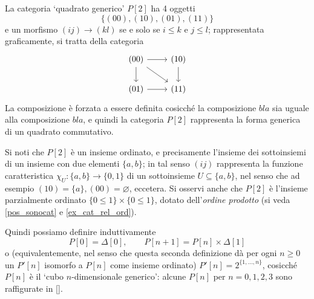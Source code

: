 \begin{example}\label{ex_quadcuboncubo}
	La categoria `quadrato generico' $P[2]$ ha 4 oggetti
	\[\{(00),(10),(01),(11)\} \]
	e un morfismo $(ij)\to(kl)$ se e solo se $i\le k$ e $j\le l$; rappresentata graficamente, si tratta della categoria
	\[\begin{tikzcd}
		(00) \ar[r]\ar[d]\ar[dr]& (10)\ar[d] \\
		(01) \ar[r]& (11)
	\end{tikzcd}\]
	La composizione è forzata a essere definita cosicché la composizione $bla$ sia uguale alla composizione $bla$, e quindi la categoria $P[2]$ rappresenta la forma generica di un quadrato commutativo.

	Si noti che $P[2]$ è un insieme ordinato, e precisamente l'insieme dei sottoinsiemi di un insieme con due elementi $\{a,b\}$; in tal senso $(ij)$ rappresenta la funzione caratteristica $\chi_U : \{a,b\}\to \{0,1\}$ di un sottoinsieme $U\subseteq \{a,b\}$, nel senso che ad esempio $(10)=\{a\}, (00)=\varnothing$, eccetera. Si osservi anche che $P[2]$ è l'insieme parzialmente ordinato $\{0\le 1\}\times \{0\le 1\}$, dotato dell'\emph{ordine prodotto} (si veda \ref{pos_sonocat} e \ref{ex_cat_rel_ord}).

	Quindi possiamo definire induttivamente
	\[P[0] = \Delta[0], \qquad P[n+1] = P[n]\times \Delta[1]\]
	o (equivalentemente, nel senso che questa seconda definizione dà per ogni $n\ge 0$ un $P'[n]$ isomorfo a $P[n]$ come insieme ordinato) $P'[n] = 2^{\{1,\dots,n\}}$, cosicché $P[n]$ è il `cubo $n$-dimensionale generico': alcune $P[n]$ per $n=0,1,2,3$ sono raffigurate in \ref{}.
\end{example}
